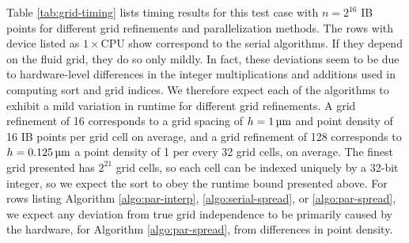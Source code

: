 Table \ref{tab:grid-timing} lists timing results for this test case with
$n=2^{16}$ IB points for different grid refinements and parallelization
methods. The rows with device listed as $1\times$CPU show correspond to the
serial algorithms. If they depend on the fluid grid, they do so only mildly. In
fact, these deviations seem to be due to hardware-level differences in the
integer multiplications and additions used in computing sort and grid indices.
We therefore expect each of the algorithms to exhibit a mild variation in
runtime for different grid refinements. A grid refinement of 16 corresponds to
a grid spacing of $h=1\um$ and point density of 16 IB points per grid cell on
average, and a grid refinement of 128 corresponds to $h=0.125\um$ a point
density of 1 per every 32 grid cells, on average. The finest grid presented has
$2^{21}$ grid cells, so each cell can be indexed uniquely by a 32-bit integer,
so we expect the sort to obey the runtime bound presented above. For rows
listing Algorithm \ref{algo:par-interp}, \ref{algo:serial-spread}, or
\ref{algo:par-spread}, we expect any deviation from true grid independence to
be primarily caused by the hardware, for Algorithm \ref{algo:par-spread}, from
differences in point density.




